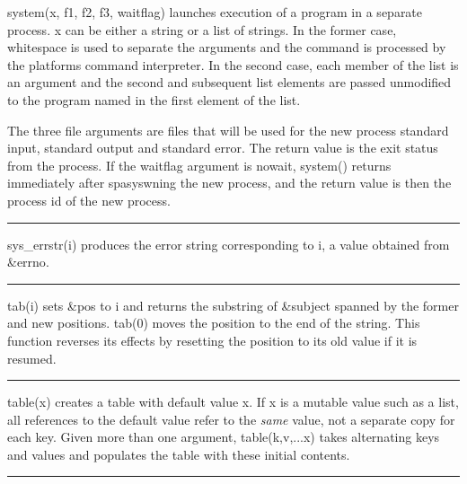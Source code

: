 \noindent
{}\textsf{system(x, f1, f2, f3, waitflag)} launches
execution of a program in a separate process. \textsf{x} can be either
a string or a list of strings. In the former case, whitespace is used
to separate the arguments and the command is processed by the
platform{\textquotesingle}s command interpreter. In the second case,
each member of the list is an argument and the second and subsequent
list elements are passed unmodified to the program named in the first
element of the list.

The three file arguments are files that will be used for the new
process{\textquotesingle} standard input, standard output and standard
error. The return value is the exit status from the process. If the
\textsf{waitflag} argument is
\textsf{{\textquotedbl}nowait{\textquotedbl}}, \textsf{system()}
returns immediately after spasyswning the new process, and the return
value is then the process id of the new process.

\bigskip\hrule\vspace{0.1cm}

\noindent
{}\textsf{sys\_errstr(i)} produces the error string
corresponding to \textsf{i}, a value obtained from \textsf{\&errno}.

\bigskip\hrule\vspace{0.1cm}

\noindent
{}\textsf{tab(i)} sets \textsf{\&pos} to \textsf{i} and
returns the substring of \textsf{\&subject} spanned by the former and
new positions. \textsf{tab(0)} moves the position to the end of the
string. This function reverses its effects by resetting the position to
its old value if it is resumed.

\bigskip\hrule\vspace{0.1cm}

\noindent
{}\textsf{table(x)} creates a table with default value
\textsf{x}. If \textsf{x} is a mutable value such as a list, all
references to the default value refer to the \textit{same} value, not a
separate copy for each key. Given more than one argument,
\textsf{table(k,v,...x)} takes alternating keys and values and
populates the table with these initial contents.

\bigskip\hrule\vspace{0.1cm}

